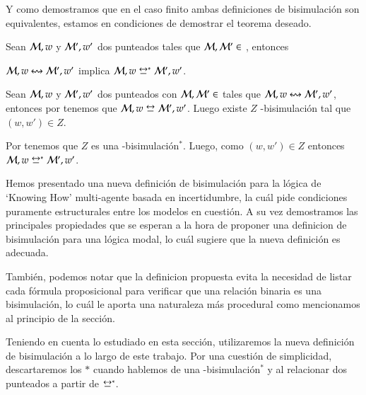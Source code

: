 Y como demostramos que en el caso finito ambas definiciones de bisimulación son equivalentes, estamos en condiciones de demostrar el teorema deseado. 

\begin{teorema}\label{thm:new-bisim-finite-equiv}
    Sean $\mathcal{M},w$ y $\mathcal{M}',w'$ dos \ultss punteados tales que $\mathcal{M}, \mathcal{M}' \in$ \MFD, entonces
    \begin{center}
        $\mathcal{M},w \mathrel{\leftrightsquigarrow} \mathcal{M}', w'$ implica $\model,w \bisim^* \model', w'$.
    \end{center}
\end{teorema}

\begin{demostracion}
    Sean $\mathcal{M},w$ y $\mathcal{M}',w'$ dos \ultss punteados con $\mathcal{M}, \mathcal{M}' \in $ \MFD tales que $\mathcal{M},w \mathrel{\leftrightsquigarrow} \mathcal{M}', w'$, 
    entonces por  tenemos que $\model,w \bisim \model', w'$. 
    Luego existe $Z$ \KHilogic-bisimulación tal que $(w,w') \in Z$.

    Por  tenemos que $Z$ es una \KHilogic-bisimulación$^*$. Luego, como $(w,w') \in Z$ 
    entonces $\model,w \bisim^* \model', w'$.
\end{demostracion}

Hemos presentado una nueva definición de bisimulación para la lógica de `Knowing How' multi-agente basada en incertidumbre, la 
cuál pide condiciones puramente estructurales entre los modelos en cuestión. A su vez demostramos las principales propiedades que se 
esperan a la hora de proponer una definicion de bisimulación para una lógica modal, lo cuál sugiere que la nueva definición es adecuada.

También, podemos notar que la definicion propuesta evita la necesidad de listar cada fórmula proposicional para verificar que una relación binaria
es una bisimulación, lo cuál le aporta una naturaleza más procedural como mencionamos al principio de la sección.  

Teniendo en cuenta lo estudiado en esta sección, utilizaremos la nueva definición de bisimulación a lo largo de este trabajo.
Por una cuestión de simplicidad, descartaremos los $*$ cuando hablemos de una \KHilogic-bisimulación$^*$ y 
al relacionar dos \ultss punteados a partir de $\bisim^*$.